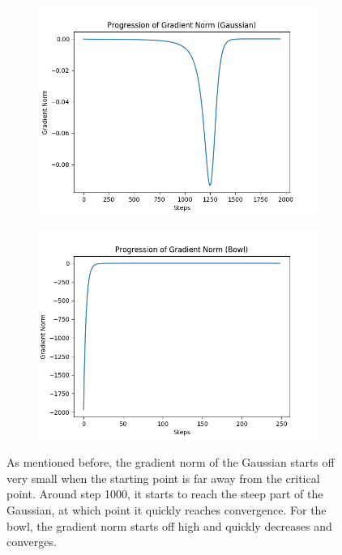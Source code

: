 \documentclass{article}
\begin{document}
\begin{figure}[H]
\centering
        \begin{subfigure}[b]{0.4\textwidth}
                \includegraphics[width=\linewidth]{../P1/figs/grad_norm_gauss.png}
        \end{subfigure}%
        \begin{subfigure}[b]{0.4\textwidth}
                \includegraphics[width=\linewidth]{../P1/figs/grad_norm_bowl.png}
        \end{subfigure}%
\caption*{As mentioned before, the gradient norm of the Gaussian starts off very small when the starting point is far away from the critical point. Around step 1000, it starts to reach the steep part of the Gaussian, at which point it quickly reaches convergence. For the bowl, the gradient norm starts off high and quickly decreases and converges.}
\end{figure}
\end{document}
